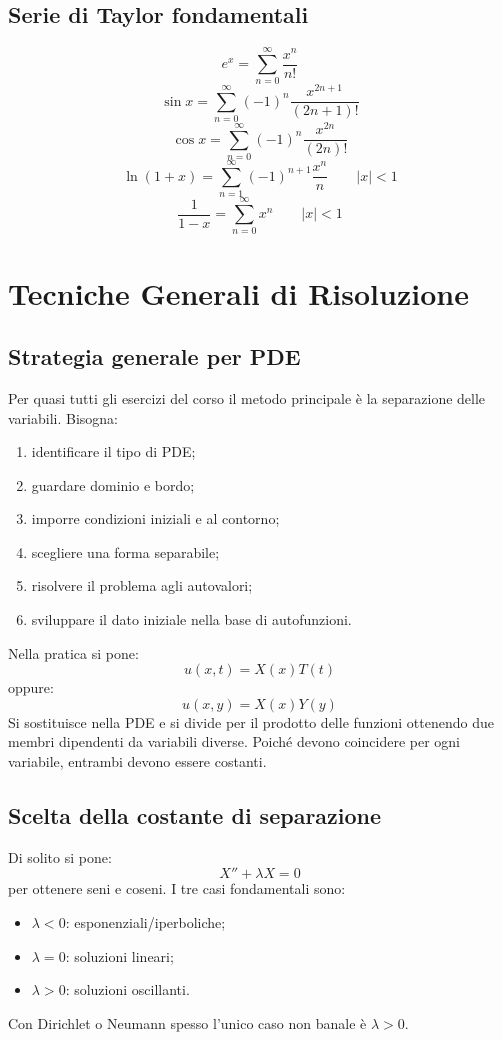 \documentclass[a4paper,10pt]{article}
\begin{document}
\subsection{Serie di Taylor fondamentali}
\[e^x=\sum_{n=0}^{\infty}\frac{x^n}{n!}\]
\[\sin x=\sum_{n=0}^{\infty}(-1)^n\frac{x^{2n+1}}{(2n+1)!}\]
\[\cos x=\sum_{n=0}^{\infty}(-1)^n\frac{x^{2n}}{(2n)!}\]
\[\ln(1+x)=\sum_{n=1}^{\infty}(-1)^{n+1}\frac{x^n}{n}
\qquad |x|<1\]
\[\frac1{1-x}=\sum_{n=0}^{\infty}x^n
\qquad |x|<1\]
\section{Tecniche Generali di Risoluzione}
\subsection{Strategia generale per PDE}
Per quasi tutti gli esercizi del corso il metodo principale è la separazione delle variabili.
Bisogna:
\begin{enumerate}
\item identificare il tipo di PDE;
\item guardare dominio e bordo;
\item imporre condizioni iniziali e al contorno;
\item scegliere una forma separabile;
\item risolvere il problema agli autovalori;
\item sviluppare il dato iniziale nella base di autofunzioni.
\end{enumerate}
Nella pratica si pone:
\[u(x,t)=X(x)T(t)\]
oppure:
\[u(x,y)=X(x)Y(y)\]
Si sostituisce nella PDE e si divide per il prodotto delle funzioni ottenendo due membri dipendenti da variabili diverse.
Poiché devono coincidere per ogni variabile, entrambi devono essere costanti.
\subsection{Scelta della costante di separazione}
Di solito si pone:
\[X''+\lambda X=0\]
per ottenere seni e coseni.
I tre casi fondamentali sono:
\begin{itemize}
\item $\lambda<0$: esponenziali/iperboliche;
\item $\lambda=0$: soluzioni lineari;
\item $\lambda>0$: soluzioni oscillanti.
\end{itemize}
Con Dirichlet o Neumann spesso l'unico caso non banale è $\lambda>0$.
\end{document}

